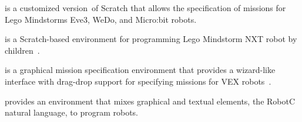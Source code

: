 \parhead{\scratchev} is a customized version\,\cite{scratchEv3} of Scratch that allows the specification of missions for  Lego Mindstorms Eve3, WeDo, and Micro:bit robots. %

\parhead{\enchanting} is a  Scratch-based environment for programming Lego Mindstorm NXT robot by children~\cite{enchanting}. %

\parhead{\easyc} is a graphical mission specification environment that provides a wizard-like interface with drag-drop support for specifying missions for VEX robots~\cite{EasyC}. %


\parhead{\robotc} provides an environment that mixes graphical and textual elements, the RobotC natural language, to program robots\cite{robotc}.

